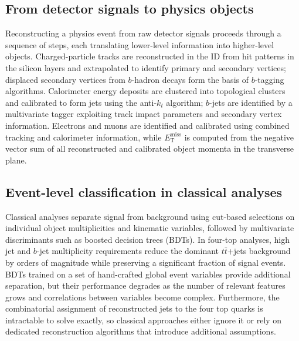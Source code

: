 
\subsection{From detector signals to physics objects}
\label{subsec:intro_reconstruction}

Reconstructing a physics event from raw detector signals proceeds through a sequence of steps, each translating lower-level information into higher-level objects.
Charged-particle tracks are reconstructed in the ID from hit patterns in the silicon layers and extrapolated to identify primary and secondary vertices; displaced secondary vertices from $b$-hadron decays form the basis of $b$-tagging algorithms.
Calorimeter energy deposits are clustered into topological clusters and calibrated to form jets using the anti-$k_t$ algorithm; $b$-jets are identified by a multivariate tagger exploiting track impact parameters and secondary vertex information.
Electrons and muons are identified and calibrated using combined tracking and calorimeter information, while $E_{\mathrm{T}}^{\mathrm{miss}}$ is computed from the negative vector sum of all reconstructed and calibrated object momenta in the transverse plane.


\subsection{Event-level classification in classical analyses}
\label{subsec:intro_classical_classification}

Classical analyses separate signal from background using cut-based selections on individual object multiplicities and kinematic variables, followed by multivariate discriminants such as boosted decision trees (BDTs).
In four-top analyses, high jet and $b$-jet multiplicity requirements reduce the dominant $t\bar{t}$+jets background by orders of magnitude while preserving a significant fraction of signal events.
BDTs trained on a set of hand-crafted global event variables provide additional separation, but their performance degrades as the number of relevant features grows and correlations between variables become complex.
Furthermore, the combinatorial assignment of reconstructed jets to the four top quarks is intractable to solve exactly, so classical approaches either ignore it or rely on dedicated reconstruction algorithms that introduce additional assumptions.


